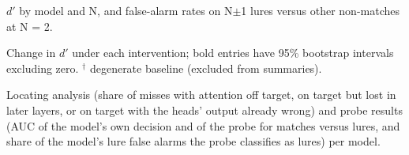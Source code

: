 \documentclass{article}
\newcommand{\dprime}{$d'$}
\begin{document}
\begin{table}[h]
  \centering\small
  \caption{\dprime{} by model and N, and false-alarm rates on N$\pm$1 lures versus other non-matches at N = 2.}
  \label{tab:l2}
  
\end{table}

\begin{table}[h]
  \centering\small
  \caption{Change in \dprime{} under each intervention; bold entries have 95\% bootstrap intervals excluding zero. $^\dagger$ degenerate baseline (excluded from summaries).}
  \label{tab:b1}
  
\end{table}

\begin{table}[h]
  \centering\small
  \caption{Locating analysis (share of misses with attention off target, on target but lost in later layers, or on target with the heads' output already wrong) and probe results (AUC of the model's own decision and of the probe for matches versus lures, and share of the model's lure false alarms the probe classifies as lures) per model.}
  \label{tab:l7l8}
  \setlength{\tabcolsep}{4.5pt}
  
\end{table}
\end{document}
